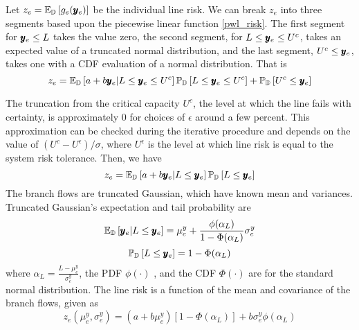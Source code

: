 

Let $ z_e = \mathbb{E}_{\mathbb{D}} \left[ g_e(\pmb{y}_e) \right] $ be the individual line risk. We can break $z_e$ into three segments based upon the piecewise linear function \ref{pwl_risk}.  The first segment for $\pmb{y}_e \leq L$ takes the value zero, the second segment, for $L \leq \pmb{y}_e \leq U^c$, takes an expected value of a truncated normal distribution, and the last segment, $U^c \leq \pmb{y}_e$, takes one with a CDF evaluation of a normal distribution.  That is
\[ z_e = \mathbb{E}_{\mathbb{D}} \left[  a+b\pmb{y}_e | L \leq \pmb{y}_e \leq U^c  \right] \mathbb{P}_{\mathbb{D}} \left[ L\leq \pmb{y}_e \leq U^c \right]  + \mathbb{P}_{\mathbb{D}} \left[  U^c \leq \pmb{y}_e  \right] \] 

 The truncation from the critical capacity $U^c$, the level at which the line fails with certainty, is approximately 0 for choices of $\epsilon$ around a few percent.  This approximation can be checked during the iterative procedure and depends on the value of $ (U^c - U^{\epsilon} )/\sigma $, where $U^\epsilon$ is the level at which line risk is equal to the system risk tolerance.  Then, we have
\[ z_e = \mathbb{E}_{\mathbb{D}} \left[  a+b\pmb{y}_e | L \leq \pmb{y}_e  \right] \mathbb{P}_{\mathbb{D}} \left[ L\leq \pmb{y}_e \right] \]
The branch flows are truncated Gaussian, which have known mean and variances. Truncated Gaussian's expectation and tail probability are
\[  \mathbb{E}_{\mathbb{D}} \left[  \pmb{y}_e | L \leq \pmb{y}_e  \right] = \mu^y_e + \frac{\phi( \alpha_L )}{ 1- \Phi(\alpha_L)} \sigma^y_e \]
\[ \mathbb{P}_{\mathbb{D}} \left[  L \leq \pmb{y}_e  \right] = 1 - \Phi(\alpha_L) \]
where $\alpha_L = \frac{L - \mu^y_e}{\sigma^y_e}$, the PDF $\phi(\cdot)$ , and the CDF $\Phi(\cdot)$ are for the standard normal distribution.  The line risk is a function of the mean and covariance of the branch flows, given as
\begin{equation}\label{line_risk}
z_e(\mu^y_e,\sigma^y_e) = (a + b \mu^y_e)\left[ 1 - \Phi(\alpha_L) \right]  + b \sigma^y_e \phi(\alpha_L) 
\end{equation}







